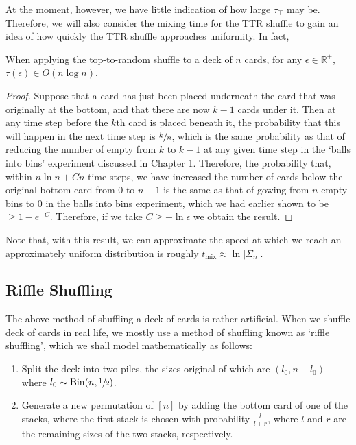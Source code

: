 		At the moment, however, we have little indication of how large $\tau_\top$
		may be. Therefore, we will also consider the mixing time for the TTR shuffle to
		gain an idea of how quickly the TTR shuffle approaches uniformity. In fact,
		\begin{lemma}
			When applying the top-to-random shuffle to a deck of $n$ cards, for any 
			$\epsilon \in \mathbb{R}^+$, $\tau(\epsilon) \in O(n \log n)$. 
		\end{lemma}
		\begin{proof}
			Suppose that a card has just been placed underneath the card that was 
			originally at the bottom, and that there are now $k-1$ cards under it.
			Then at any time step before the $k$th card is placed beneath it, the 
			probability that this will happen in the next time step is $\sfrac{k}{n}$,
			which is the same probability as that of reducing the number of empty from
			$k$ to $k-1$ at any given time step in the `balls into bins' experiment 
			discussed in Chapter 1. Therefore, the probability that, within 
			$n \ln n + Cn$ time steps, we have increased the number of cards below the
			original bottom card from $0$ to $n-1$ is the same as that of gowing from 
			$n$ empty bins to $0$ in the balls into bins experiment, which we had 
			earlier shown to be $\geq 1 - e^{-C}$. Therefore, if we take $C \geq -\ln 
			\epsilon$ we obtain the result.
		\end{proof}
		Note that, with this result, we can approximate the speed at which we reach an 
		approximately uniform distribution is roughly $t_\mathrm{mix}\approx\ln|\Sigma_n|$.

		\subsection{Riffle Shuffling}
		The above method of shuffling a deck of cards is rather artificial. When we shuffle 
		deck of cards in real life, we mostly use a method of shuffling known as `riffle 
		shuffling', which we shall model mathematically as follows:
		\begin{enumerate}[(1)]
			\item Split the deck into two piles, the sizes original of which are 
			$(l_0, n-l_0)$ where $l_0 \sim \mathrm{Bin}(n, \sfrac{1}{2})$.
			\item Generate a new permutation of $[n]$ by adding the bottom card of 
			one of the stacks, where the first stack is chosen with probability 
			$\frac{l}{l+r}$, where $l$ and $r$ are the remaining sizes of the two 
			stacks, respectively. 
		\end{enumerate}
		
